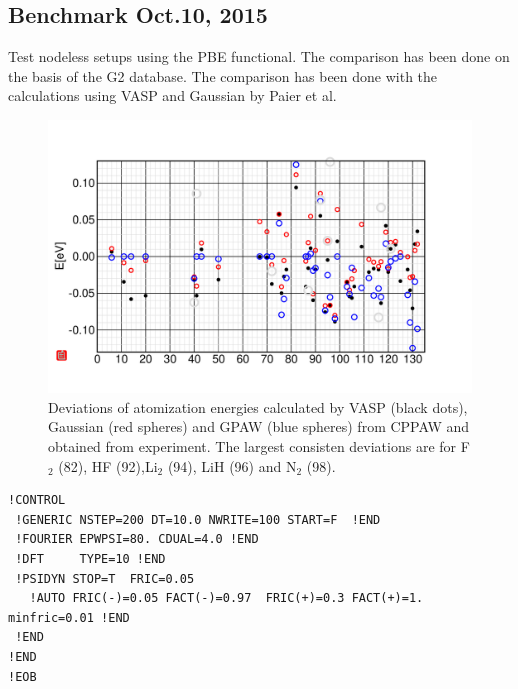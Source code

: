 \documentclass{book}
\begin{document}
\subsection*{Benchmark Oct.10, 2015}
Test nodeless setups using the PBE
functional\cite{perdew96_prl77_3865}. The comparison has been done on
the basis of the G2 database. The comparison has been done with the
calculations using VASP and Gaussian by Paier et
al.\cite{paier05_jcp122_234102}


\begin{figure}[h!]
\includegraphics[width=\linewidth]{Figs/151010benchmark/g2benchmark}
\caption{\label{fig:151010benchmark}Deviations of atomization energies
  calculated by VASP (black dots), Gaussian (red spheres) and GPAW
  (blue spheres) from CPPAW and obtained from experiment. The largest
  consisten deviations are for F$_2$ (82), HF (92),Li$_2$ (94), LiH
  (96) and N$_2$ (98). }
\end{figure}

{\tiny
\begin{verbatim}
!CONTROL
 !GENERIC NSTEP=200 DT=10.0 NWRITE=100 START=F  !END 
 !FOURIER EPWPSI=80. CDUAL=4.0 !END
 !DFT     TYPE=10 !END 
 !PSIDYN STOP=T  FRIC=0.05 
   !AUTO FRIC(-)=0.05 FACT(-)=0.97  FRIC(+)=0.3 FACT(+)=1. minfric=0.01 !END
 !END
!END
!EOB 
\end{verbatim}
}
\end{document}
